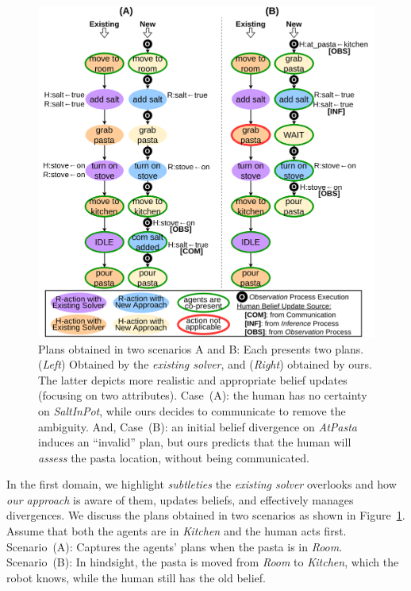 \documentclass[letterpaper]{article} %
\begin{document}
\begin{figure}[t!]
    \centering
    \includegraphics[width=0.99\linewidth]{figures/qualitative_plans.png}
    \caption{
    Plans obtained in two scenarios A and B: Each presents two plans. (\textit{Left}) Obtained by the \textit{existing solver}, and (\textit{Right}) obtained by ours. The latter depicts more realistic and appropriate belief updates (focusing on two attributes).
    Case~(A): the human has no certainty on {\em SaltInPot}, while ours decides to communicate to remove the ambiguity. 
    And, Case~(B): an initial belief divergence on {\em AtPasta} induces an ``invalid'' plan, but ours predicts that the human will \textit{assess} the pasta location, without being communicated.
    }
    \label{fig:scenarios}
\end{figure}

In the first domain, we highlight \textit{subtleties} the \textit{existing solver} overlooks and how \textit{our approach} is aware of them, updates beliefs, and effectively manages divergences. 
We discuss the plans obtained in two scenarios 
as shown in Figure~\ref{fig:scenarios}. Assume that both the agents are in \textit{Kitchen} and the human acts first. Scenario~(A): Captures the agents' plans when the pasta is in \textit{Room}. 
Scenario~(B): 
In hindsight, the pasta is moved from \textit{Room} to {\em Kitchen}, which the robot knows, while the human still has the old belief.
\end{document}

